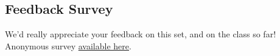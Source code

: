 \documentclass[11pt]{article}
\begin{document}
    \subsection{Feedback Survey}\label{feedback-survey}

We'd really appreciate your feedback on this set, and on the class so
far! Anonymous survey
\href{https://goo.gl/forms/gSqeSnMdY8WHeCiC2}{available here}.


    
    
    
    
\end{document}
